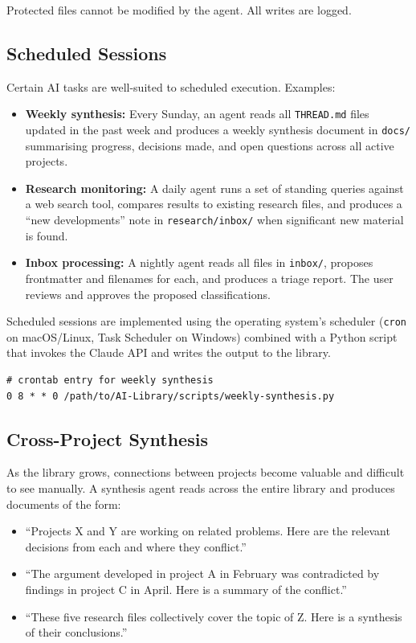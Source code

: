 \documentclass[12pt,letterpaper]{article}
\begin{document}
Protected files cannot be modified by the agent. All writes are logged.

\subsection{Scheduled Sessions}

Certain AI tasks are well-suited to scheduled execution. Examples:

\begin{itemize}
  \item \textbf{Weekly synthesis:} Every Sunday, an agent reads all
        \texttt{THREAD.md} files updated in the past week and produces
        a weekly synthesis document in \texttt{docs/} summarising
        progress, decisions made, and open questions across all
        active projects.
  \item \textbf{Research monitoring:} A daily agent runs a set of
        standing queries against a web search tool, compares results
        to existing research files, and produces a ``new developments''
        note in \texttt{research/inbox/} when significant new material
        is found.
  \item \textbf{Inbox processing:} A nightly agent reads all files in
        \texttt{inbox/}, proposes frontmatter and filenames for each,
        and produces a triage report. The user reviews and approves
        the proposed classifications.
\end{itemize}

Scheduled sessions are implemented using the operating system's
scheduler (\texttt{cron} on macOS/Linux, Task Scheduler on Windows)
combined with a Python script that invokes the Claude API and writes
the output to the library.

\begin{lstlisting}
# crontab entry for weekly synthesis
0 8 * * 0 /path/to/AI-Library/scripts/weekly-synthesis.py
\end{lstlisting}

\subsection{Cross-Project Synthesis}

As the library grows, connections between projects become valuable and
difficult to see manually. A synthesis agent reads across the entire
library and produces documents of the form:

\begin{itemize}
  \item ``Projects X and Y are working on related problems.
        Here are the relevant decisions from each and where they conflict.''
  \item ``The argument developed in project A in February was
        contradicted by findings in project C in April.
        Here is a summary of the conflict.''
  \item ``These five research files collectively cover the topic of Z.
        Here is a synthesis of their conclusions.''
\end{itemize}
\end{document}
